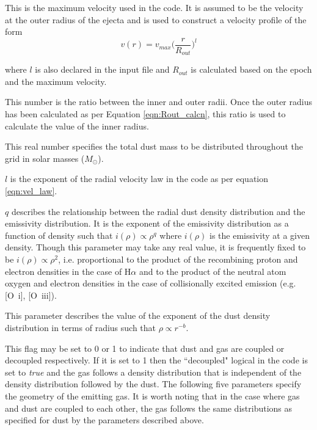  This is the maximum velocity used in the code.  It is assumed to be the velocity at the outer radius of the ejecta and is used to construct a velocity profile of the form
 \begin{equation}
 v(r) = v_{max} \Big( \frac{r}{R_{out}} \Big)^l
 \label{eqn:vel_law}
 \end{equation}

 where $l$ is also declared in the input file and $R_{out}$ is calculated based on the epoch and the maximum velocity.


 This number is the ratio between the inner and outer radii.  Once the outer radius has been calculated as per Equation \ref{eqn:Rout_calcn}, this ratio is used to calculate the value of the inner radius.


 This real number specifies the total dust mass to be distributed throughout the grid in solar masses ($M_{\odot}$).


 $l$ is the exponent of the radial velocity law in the code as per equation \ref{eqn:vel_law}.


 $q$ describes the relationship between the radial dust density distribution and the emissivity distribution.  It is the exponent of the emissivity distribution as a function of density such that $i(\rho) \propto \rho^q$ where $i(\rho)$ is the emissivity at a given density.  Though this parameter may take any real value, it is frequently fixed to be $i(\rho) \propto \rho^2$, i.e. proportional to the product of the recombining proton and electron densities in the case of H$\alpha$ and to the product of the neutral atom oxygen and electron densities in the case of collisionally excited emission (e.g. [O~{\sc i}], [O~{\sc iii}]).



 This parameter describes the value of the exponent of the dust density distribution in terms of radius such that $\rho \propto r^{-b}$.


 This flag may be set to 0 or 1 to indicate that dust and gas are coupled or decoupled respectively.  If it is set to 1 then the ``decoupled" logical in the code is set to \textit{true} and the gas follows a density distribution that is independent of the density distribution followed by the dust.  The following five parameters specify the geometry of the emitting gas.  It is worth noting that in the case where gas and dust are coupled to each other, the gas follows the same distributions as specified for dust by the parameters described above. 

